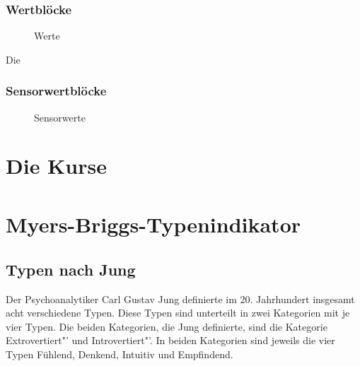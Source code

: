 \subsubsection{Wertblöcke}
\begin{figure}[htbp!]
	\centering
	\caption[Werte]{Werte} %
	\label{img:Werte}
\end{figure}

Die


\subsubsection{Sensorwertblöcke}
\begin{figure}[htbp!]
	\centering
	\caption[Sensorwerte]{Sensorwerte} %
	\label{img:Sensorwerte}
\end{figure}


\section{Die Kurse}






\section{Myers-Briggs-Typenindikator\textsuperscript{\textregistered}} 
\subsection{Typen nach Jung}
Der Psychoanalytiker Carl Gustav Jung definierte im 20. Jahrhundert insgesamt acht verschiedene Typen. Diese Typen sind unterteilt in zwei Kategorien mit je vier Typen. Die beiden Kategorien, die Jung definierte, sind die Kategorie \glqq Extrovertiert"' und \glqq Introvertiert"'. In beiden Kategorien sind jeweils die vier Typen Fühlend, Denkend, Intuitiv und Empfindend. \cite{jung_1921}\\

